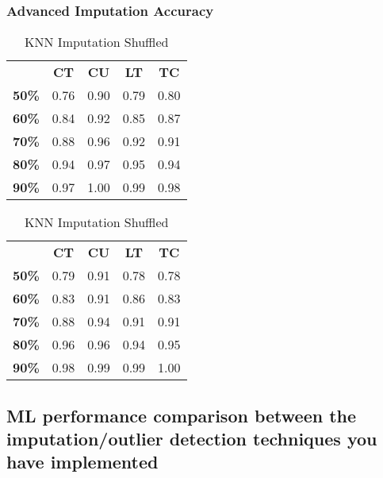 \documentclass{article}
\begin{document}
\subsubsection{Advanced Imputation Accuracy}
\begin{table}[h]
\begin{minipage}{.45\textwidth}\centering
\begin{tabular}{ccccc}
              & \textbf{CT} & \textbf{CU} & \textbf{LT} & \textbf{TC} \\
\textbf{50\%} & 0.76        & 0.90        & 0.79        & 0.80        \\
\textbf{60\%} & 0.84        & 0.92        & 0.85        & 0.87        \\
\textbf{70\%} & 0.88        & 0.96        & 0.92        & 0.91        \\
\textbf{80\%} & 0.94        & 0.97        & 0.95        & 0.94        \\
\textbf{90\%} & 0.97        & 1.00        & 0.99        & 0.98       
\end{tabular}
\caption{KNN Imputation}
\end{minipage}
\hfill
\begin{minipage}{.45\textwidth}\centering
\begin{tabular}{ccccc}
              & \textbf{CT} & \textbf{CU} & \textbf{LT} & \textbf{TC} \\
\textbf{50\%} & 0.79        & 0.91        & 0.78        & 0.78        \\
\textbf{60\%} & 0.83        & 0.91        & 0.86        & 0.83        \\
\textbf{70\%} & 0.88        & 0.94        & 0.91        & 0.91        \\
\textbf{80\%} & 0.96        & 0.96        & 0.94        & 0.95        \\
\textbf{90\%} & 0.98        & 0.99        & 0.99        & 1.00       
\end{tabular}
\caption{KNN Imputation Shuffled}
\end{minipage}
\end{table}

\subsection{ML performance comparison between the imputation/outlier detection techniques you have implemented}
\end{document}

